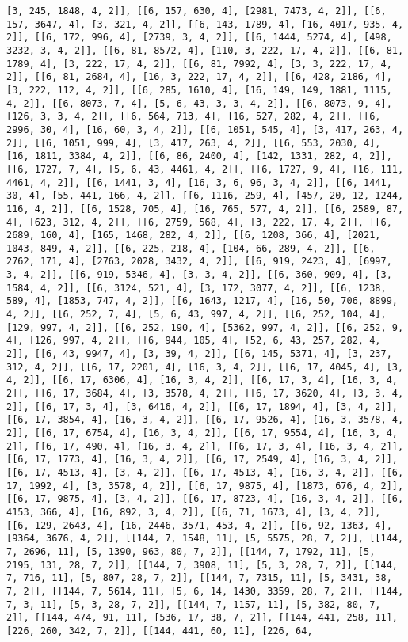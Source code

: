 \documentclass[12pt,fleqn]{article}\usepackage{../../common}
\begin{document}
\begin{verbatim}
[3, 245, 1848, 4, 2]], [[6, 157, 630, 4], [2981, 7473, 4, 2]], [[6, 157, 3647, 4], [3, 321, 4, 2]], [[6, 143, 1789, 4], [16, 4017, 935, 4, 2]], [[6, 172, 996, 4], [2739, 3, 4, 2]], [[6, 1444, 5274, 4], [498, 3232, 3, 4, 2]], [[6, 81, 8572, 4], [110, 3, 222, 17, 4, 2]], [[6, 81, 1789, 4], [3, 222, 17, 4, 2]], [[6, 81, 7992, 4], [3, 3, 222, 17, 4, 2]], [[6, 81, 2684, 4], [16, 3, 222, 17, 4, 2]], [[6, 428, 2186, 4], [3, 222, 112, 4, 2]], [[6, 285, 1610, 4], [16, 149, 149, 1881, 1115, 4, 2]], [[6, 8073, 7, 4], [5, 6, 43, 3, 3, 4, 2]], [[6, 8073, 9, 4], [126, 3, 3, 4, 2]], [[6, 564, 713, 4], [16, 527, 282, 4, 2]], [[6, 2996, 30, 4], [16, 60, 3, 4, 2]], [[6, 1051, 545, 4], [3, 417, 263, 4, 2]], [[6, 1051, 999, 4], [3, 417, 263, 4, 2]], [[6, 553, 2030, 4], [16, 1811, 3384, 4, 2]], [[6, 86, 2400, 4], [142, 1331, 282, 4, 2]], [[6, 1727, 7, 4], [5, 6, 43, 4461, 4, 2]], [[6, 1727, 9, 4], [16, 111, 4461, 4, 2]], [[6, 1441, 3, 4], [16, 3, 6, 96, 3, 4, 2]], [[6, 1441, 30, 4], [55, 441, 166, 4, 2]], [[6, 1116, 259, 4], [457, 20, 12, 1244, 116, 4, 2]], [[6, 1528, 705, 4], [16, 765, 577, 4, 2]], [[6, 2589, 87, 4], [623, 312, 4, 2]], [[6, 2759, 568, 4], [3, 222, 17, 4, 2]], [[6, 2689, 160, 4], [165, 1468, 282, 4, 2]], [[6, 1208, 366, 4], [2021, 1043, 849, 4, 2]], [[6, 225, 218, 4], [104, 66, 289, 4, 2]], [[6, 2762, 171, 4], [2763, 2028, 3432, 4, 2]], [[6, 919, 2423, 4], [6997, 3, 4, 2]], [[6, 919, 5346, 4], [3, 3, 4, 2]], [[6, 360, 909, 4], [3, 1584, 4, 2]], [[6, 3124, 521, 4], [3, 172, 3077, 4, 2]], [[6, 1238, 589, 4], [1853, 747, 4, 2]], [[6, 1643, 1217, 4], [16, 50, 706, 8899, 4, 2]], [[6, 252, 7, 4], [5, 6, 43, 997, 4, 2]], [[6, 252, 104, 4], [129, 997, 4, 2]], [[6, 252, 190, 4], [5362, 997, 4, 2]], [[6, 252, 9, 4], [126, 997, 4, 2]], [[6, 944, 105, 4], [52, 6, 43, 257, 282, 4, 2]], [[6, 43, 9947, 4], [3, 39, 4, 2]], [[6, 145, 5371, 4], [3, 237, 312, 4, 2]], [[6, 17, 2201, 4], [16, 3, 4, 2]], [[6, 17, 4045, 4], [3, 4, 2]], [[6, 17, 6306, 4], [16, 3, 4, 2]], [[6, 17, 3, 4], [16, 3, 4, 2]], [[6, 17, 3684, 4], [3, 3578, 4, 2]], [[6, 17, 3620, 4], [3, 3, 4, 2]], [[6, 17, 3, 4], [3, 6416, 4, 2]], [[6, 17, 1894, 4], [3, 4, 2]], [[6, 17, 3854, 4], [16, 3, 4, 2]], [[6, 17, 9526, 4], [16, 3, 3578, 4, 2]], [[6, 17, 6754, 4], [16, 3, 4, 2]], [[6, 17, 9554, 4], [16, 3, 4, 2]], [[6, 17, 490, 4], [16, 3, 4, 2]], [[6, 17, 3, 4], [16, 3, 4, 2]], [[6, 17, 1773, 4], [16, 3, 4, 2]], [[6, 17, 2549, 4], [16, 3, 4, 2]], [[6, 17, 4513, 4], [3, 4, 2]], [[6, 17, 4513, 4], [16, 3, 4, 2]], [[6, 17, 1992, 4], [3, 3578, 4, 2]], [[6, 17, 9875, 4], [1873, 676, 4, 2]], [[6, 17, 9875, 4], [3, 4, 2]], [[6, 17, 8723, 4], [16, 3, 4, 2]], [[6, 4153, 366, 4], [16, 892, 3, 4, 2]], [[6, 71, 1673, 4], [3, 4, 2]], [[6, 129, 2643, 4], [16, 2446, 3571, 453, 4, 2]], [[6, 92, 1363, 4], [9364, 3676, 4, 2]], [[144, 7, 1548, 11], [5, 5575, 28, 7, 2]], [[144, 7, 2696, 11], [5, 1390, 963, 80, 7, 2]], [[144, 7, 1792, 11], [5, 2195, 131, 28, 7, 2]], [[144, 7, 3908, 11], [5, 3, 28, 7, 2]], [[144, 7, 716, 11], [5, 807, 28, 7, 2]], [[144, 7, 7315, 11], [5, 3431, 38, 7, 2]], [[144, 7, 5614, 11], [5, 6, 14, 1430, 3359, 28, 7, 2]], [[144, 7, 3, 11], [5, 3, 28, 7, 2]], [[144, 7, 1157, 11], [5, 382, 80, 7, 2]], [[144, 474, 91, 11], [536, 17, 38, 7, 2]], [[144, 441, 258, 11], [226, 260, 342, 7, 2]], [[144, 441, 60, 11], [226, 64, 
\end{verbatim}
\end{document}
